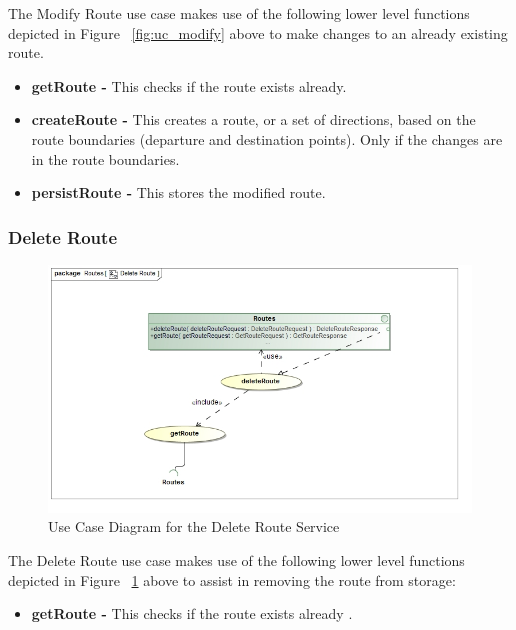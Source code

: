 \documentclass[a4paper,12pt]{article}
\begin{document}
The Modify Route use case makes use of the following lower level functions depicted in Figure ~\ref{fig:uc_modify} above to make changes to an already existing route.
\begin{itemize}
\item \textbf{getRoute -} This checks if the route exists already.
\item \textbf{createRoute -} This creates a route, or a set of directions, based on the route boundaries (departure and destination points). Only if the changes are in the route boundaries.
\item \textbf{persistRoute -} This stores the modified route.
\end{itemize}

\subsubsection{Delete Route}

\begin{figure}[ht]
\includegraphics[width=\textwidth]{images/Delete_Route.jpg}
\caption{Use Case Diagram for the Delete Route Service}
\label{fig:uc_delete}
\end{figure}

The Delete Route use case makes use of the following lower level functions depicted in Figure ~\ref{fig:uc_delete} above to assist in removing the route from storage:
\begin{itemize}
\item \textbf{getRoute -} This checks if the route exists already .
\end{itemize}
\end{document}
